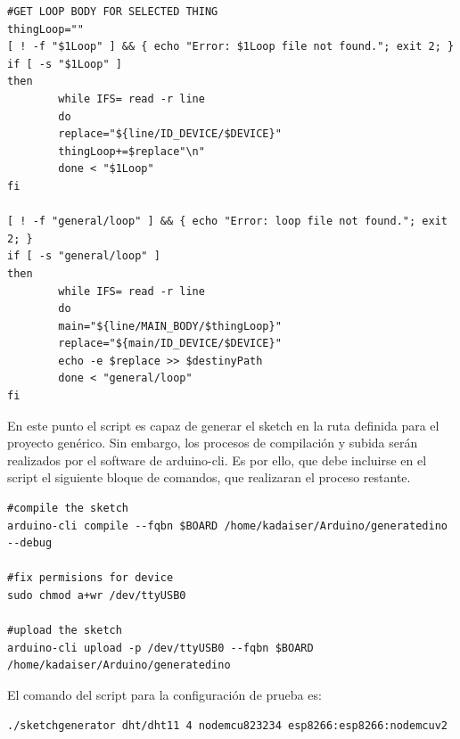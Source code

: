 \begin{verbatim}
#GET LOOP BODY FOR SELECTED THING
thingLoop=""
[ ! -f "$1Loop" ] && { echo "Error: $1Loop file not found."; exit 2; }
if [ -s "$1Loop" ]
then
        while IFS= read -r line
        do
        replace="${line/ID_DEVICE/$DEVICE}"
        thingLoop+=$replace"\n"
        done < "$1Loop"
fi

[ ! -f "general/loop" ] && { echo "Error: loop file not found."; exit 2; }
if [ -s "general/loop" ]
then
        while IFS= read -r line
        do
        main="${line/MAIN_BODY/$thingLoop}"
        replace="${main/ID_DEVICE/$DEVICE}"
        echo -e $replace >> $destinyPath
        done < "general/loop"
fi

\end{verbatim}

En este punto el script es capaz de generar el sketch en la ruta definida para el proyecto genérico. Sin embargo, los procesos de compilación y subida serán realizados por el software de arduino-cli. Es por ello, que debe incluirse en el script el siguiente bloque de comandos, que realizaran el proceso restante.

\begin{verbatim}
#compile the sketch
arduino-cli compile --fqbn $BOARD /home/kadaiser/Arduino/generatedino --debug

#fix permisions for device
sudo chmod a+wr /dev/ttyUSB0

#upload the sketch
arduino-cli upload -p /dev/ttyUSB0 --fqbn $BOARD /home/kadaiser/Arduino/generatedino
\end{verbatim}

El comando del \gls{script} para la configuración de prueba es:
\begin{verbatim}
./sketchgenerator dht/dht11 4 nodemcu823234 esp8266:esp8266:nodemcuv2
\end{verbatim}